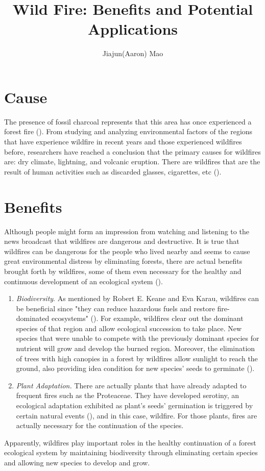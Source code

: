 \documentclass[man, 11pt]{apa6}
\title{Wild Fire: Benefits and Potential Applications}
\author{Jiajun(Aaron) Mao}
\affiliation{Kent School}
\begin{document}
  \maketitle

  \section{Cause}
  The presence of fossil charcoal represents that this area has once experienced a forest fire (\cite{charcoal}). 
  From studying and analyzing environmental factors of the regions that have experience wildfire in 
  recent years and those experienced wildfires before, researchers have reached a conclusion that 
  the primary causes for wildfires are: dry climate, lightning, and volcanic eruption. There are 
  wildfires that are the result of human activities such as discarded glasses, cigarettes, etc (\cite{Cambridge}).

  \section{Benefits}
  Although people might form an impression from watching and listening to the news broadcast that wildfires are 
  dangerous and destructive. It is true that wildfires can be dangerous for the people who lived nearby and 
  seems to cause great environmental distress by eliminating forests, there are actual benefits brought forth 
  by wildfires, some of them even necessary for the healthy and continuous development of an ecological system (\cite{ecological_benefits}).
  \begin{enumerate}  
    \item \textit{Biodiversity}. As mentioned by Robert E. Keane and Eva Karau, wildfires can be beneficial since 
      "they can reduce hazardous fuels and restore fire-dominated ecosystems" (\cite{ecological_benefits}). 
      For example, wildfires clear out the dominant species of that region and allow ecological succession to take place. 
      New species that were unable to compete with the previously dominant species for nutrient will grow and 
      develop the burned region. Moreover, the elimination of trees with high canopies in a forest by wildfires 
      allow sunlight to reach the ground, also providing idea condition for new species' seeds to germinate (\cite{ecological_assessments}). 
    \item \textit{Plant Adaptation.} There are actually plants that have already adapted to frequent fires 
      such as the Proteaceae. They have developed serotiny, an ecological adaptation exhibited as plant's seeds' 
      germination is triggered by certain natural events (\cite{serotiny}), and in this case, wildfire. For those plants, fires 
      are actually necessary for the continuation of the species. 
  \end{enumerate}
  Apparently, wildfires play important roles in the healthy continuation of a forest ecological system by 
  maintaining biodiversity through eliminating certain species and allowing new species to develop and grow.
  
\end{document}
